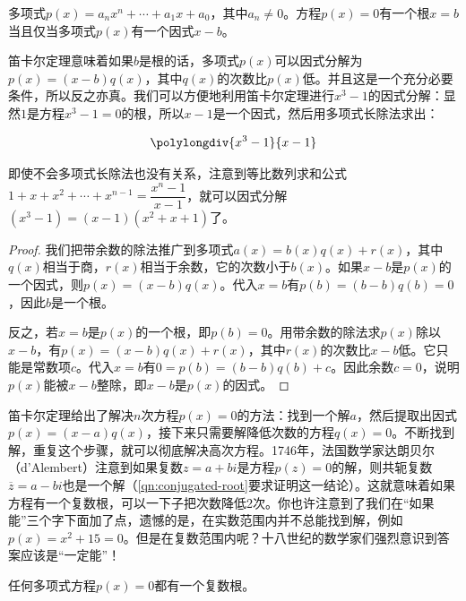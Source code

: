 \documentclass[b5paper]{ctexart}
\begin{document}
\begin{theorem}[笛卡尔]
多项式$p(x) = a_nx^n + \dotsb + a_1x + a_0$，其中$a_n \ne 0$。方程$p(x) = 0$有一个根$x = b$当且仅当多项式$p(x)$有一个因式$x - b$。
\end{theorem}

笛卡尔定理意味着如果$b$是根的话，多项式$p(x)$可以因式分解为$p(x) = (x - b)q(x)$，其中$q(x)$的次数比$p(x)$低。并且这是一个充分必要条件，所以反之亦真。我们可以方便地利用笛卡尔定理进行$x^3 - 1$的因式分解：显然$1$是方程$x^3 - 1 = 0$的根，所以$x - 1$是一个因式，然后用多项式长除法求出：

\[
\polylongdiv{x^3-1}{x-1}
\]

即使不会多项式长除法也没有关系，注意到等比数列求和公式$1 + x + x^2 + \dotsb + x^{n-1} = \dfrac{x^n - 1}{x - 1}$，就可以因式分解$(x^3 - 1) = (x - 1)(x^2 + x + 1)$了。

\begin{proof}
我们把带余数的除法推广到多项式$a(x) = b(x)q(x) + r(x)$，其中$q(x)$相当于商，$r(x)$相当于余数，它的次数小于$b(x)$。如果$x - b$是$p(x)$的一个因式，则$p(x) = (x - b)q(x)$。代入$x = b$有$p(b) = (b - b)q(b) = 0$，因此$b$是一个根。

反之，若$x = b$是$p(x)$的一个根，即$p(b) = 0$。用带余数的除法求$p(x)$除以$x - b$，有$p(x) = (x - b)q(x) + r(x)$，其中$r(x)$的次数比$x - b$低。它只能是常数项$c$。代入$x = b$有$0 = p(b) = (b - b)q(b) + c$。因此余数$c = 0$，说明$p(x)$能被$x - b$整除，即$x - b$是$p(x)$的因式。
\end{proof}

笛卡尔定理给出了解决$n$次方程$p(x) = 0$的方法：找到一个解$a$，然后提取出因式$p(x) = (x - a)q(x)$，接下来只需要解降低次数的方程$q(x) = 0$。不断找到解，重复这个步骤，就可以彻底解决高次方程。1746年，法国数学家达朗贝尔（d'Alembert）注意到如果复数$z = a + bi$是方程$p(z) = 0$的解，则共轭复数$\overline{z} = a - bi$也是一个解（\cref{qn:conjugated-root}要求证明这一结论）。这就意味着如果方程有一个复数根，可以一下子把次数降低2次。你也许注意到了我们在“如果能”三个字下面加了点，遗憾的是，在实数范围内并不总能找到解，例如$p(x) = x^2 + 15 = 0$。但是在复数范围内呢？十八世纪的数学家们强烈意识到答案应该是“一定能”！

\begin{theorem}[代数基本定理]
任何多项式方程$p(x) = 0$都有一个复数根。
\end{theorem}
\end{document}
